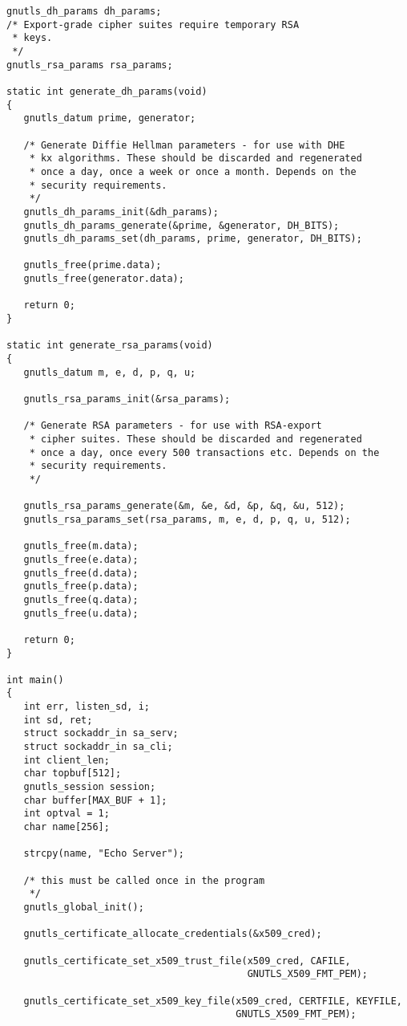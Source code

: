 \begin{verbatim}
gnutls_dh_params dh_params;
/* Export-grade cipher suites require temporary RSA
 * keys.
 */
gnutls_rsa_params rsa_params;

static int generate_dh_params(void)
{
   gnutls_datum prime, generator;

   /* Generate Diffie Hellman parameters - for use with DHE
    * kx algorithms. These should be discarded and regenerated
    * once a day, once a week or once a month. Depends on the
    * security requirements.
    */
   gnutls_dh_params_init(&dh_params);
   gnutls_dh_params_generate(&prime, &generator, DH_BITS);
   gnutls_dh_params_set(dh_params, prime, generator, DH_BITS);

   gnutls_free(prime.data);
   gnutls_free(generator.data);
   
   return 0;
}

static int generate_rsa_params(void)
{
   gnutls_datum m, e, d, p, q, u;

   gnutls_rsa_params_init(&rsa_params);

   /* Generate RSA parameters - for use with RSA-export
    * cipher suites. These should be discarded and regenerated
    * once a day, once every 500 transactions etc. Depends on the
    * security requirements.
    */

   gnutls_rsa_params_generate(&m, &e, &d, &p, &q, &u, 512);
   gnutls_rsa_params_set(rsa_params, m, e, d, p, q, u, 512);

   gnutls_free(m.data);
   gnutls_free(e.data);
   gnutls_free(d.data);
   gnutls_free(p.data);
   gnutls_free(q.data);
   gnutls_free(u.data);

   return 0;
}

int main()
{
   int err, listen_sd, i;
   int sd, ret;
   struct sockaddr_in sa_serv;
   struct sockaddr_in sa_cli;
   int client_len;
   char topbuf[512];
   gnutls_session session;
   char buffer[MAX_BUF + 1];
   int optval = 1;
   char name[256];

   strcpy(name, "Echo Server");

   /* this must be called once in the program
    */
   gnutls_global_init();

   gnutls_certificate_allocate_credentials(&x509_cred);

   gnutls_certificate_set_x509_trust_file(x509_cred, CAFILE,
                                          GNUTLS_X509_FMT_PEM);

   gnutls_certificate_set_x509_key_file(x509_cred, CERTFILE, KEYFILE,
                                        GNUTLS_X509_FMT_PEM);


\end{verbatim}
